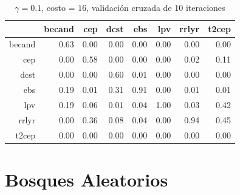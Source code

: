 \documentclass[letterpaper,12pt]{book}
\begin{document}
\begin{table}[ht]
\centering
\caption{$\gamma = 0.1$, costo = $16$, validación cruzada de 10 iteraciones} 
\label{table:cmCvSvm}
\begin{tabular}{rrrrrrrr}
  \hline
 & becand & cep & dcst & ebs & lpv & rrlyr & t2cep \\ 
  \hline
becand & 0.63 & 0.00 & 0.00 & 0.00 & 0.00 & 0.00 & 0.00 \\ 
  cep & 0.00 & 0.58 & 0.00 & 0.00 & 0.00 & 0.02 & 0.11 \\ 
  dcst & 0.00 & 0.00 & 0.60 & 0.01 & 0.00 & 0.00 & 0.00 \\ 
  ebs & 0.19 & 0.01 & 0.31 & 0.91 & 0.00 & 0.01 & 0.01 \\ 
  lpv & 0.19 & 0.06 & 0.01 & 0.04 & 1.00 & 0.03 & 0.42 \\ 
  rrlyr & 0.00 & 0.36 & 0.08 & 0.04 & 0.00 & 0.94 & 0.45 \\ 
  t2cep & 0.00 & 0.00 & 0.00 & 0.00 & 0.00 & 0.00 & 0.00 \\ 
   \hline
\end{tabular}
\end{table}

\section{Bosques Aleatorios}



  
  
  
  
  
\end{document}
